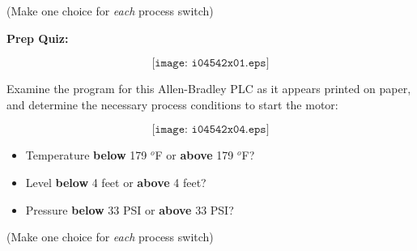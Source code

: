 \vskip 10pt

(Make one choice for {\it each} process switch)


\vfil \eject

\noindent
{\bf Prep Quiz:}

$$\texttt{[image: i04542x01.eps]}$$

Examine the program for this Allen-Bradley PLC as it appears printed on paper, and determine the necessary process conditions to start the motor:

$$\texttt{[image: i04542x04.eps]}$$

\begin{itemize}
\item{} Temperature {\bf below} 179 $^{o}$F or {\bf above} 179 $^{o}$F?
\vskip 10pt
\item{} Level {\bf below} 4 feet or {\bf above} 4 feet?
\vskip 10pt
\item{} Pressure {\bf below} 33 PSI or {\bf above} 33 PSI?
\end{itemize}

\vskip 10pt

(Make one choice for {\it each} process switch)





